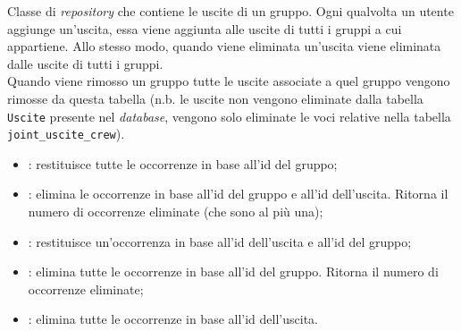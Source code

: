 Classe di \textit{repository} che contiene le uscite di un gruppo. Ogni
qualvolta un utente aggiunge un'uscita, essa viene aggiunta alle uscite di
tutti i gruppi a cui appartiene. Allo stesso modo, quando viene eliminata un'uscita
viene eliminata dalle uscite di tutti i gruppi.\\
Quando viene rimosso un gruppo tutte
le uscite associate a quel gruppo vengono rimosse da questa tabella (n.b. le
uscite non vengono eliminate dalla tabella \texttt{Uscite} presente nel
\textit{database}, vengono solo eliminate le voci relative nella tabella
\texttt{joint\_uscite\_crew}).
\begin{itemize}
    \item {}:
          restituisce tutte le occorrenze in base all'id del gruppo;
    \item {}:
          elimina le occorrenze in base all'id del gruppo e all'id dell'uscita.
          Ritorna
          il numero di occorrenze eliminate (che sono al più una);
    \item {}: restituisce un'occorrenza in base all'id dell'uscita e
          all'id del
          gruppo;
    \item {}: elimina tutte le occorrenze
          in base all'id del gruppo. Ritorna il numero di occorrenze eliminate;
    \item {}: elimina tutte le
          occorrenze in base all'id dell'uscita.
\end{itemize}

